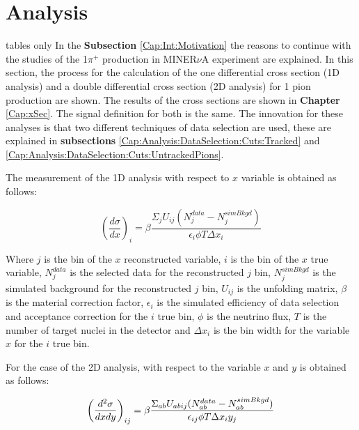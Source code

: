 \chapter{Analysis}
\minitoc
\label{Cap:Analysis}

tables only
\label{Cap:Analysis:Introduction}
In the \textbf{Subsection} \ref{Cap:Int:Motivation} the reasons to continue with the studies of the 1$\pi^+$ production in MINER$\nu$A experiment are explained. In this section, the process for the calculation of the one differential cross section (1D analysis) and a double differential cross section (2D analysis) for 1 pion production are shown. The results of the cross sections are shown in \textbf{Chapter} \ref{Cap:xSec}. The signal definition for both is the same. The innovation for these analyses is that two different techniques of data selection are used, these are explained in \textbf{subsections} \ref{Cap:Analysis:DataSelection:Cuts:Tracked} and \ref{Cap:Analysis:DataSelection:Cuts:UntrackedPions}. 

The measurement of the 1D analysis with respect to $x$ variable is obtained as follows:

\begin{equation}
    \left(\frac{d\sigma}{dx}\right)_i= \beta \frac{\Sigma_{j}U_{ij}(N^{data}_j - N^{simBkgd}_j)}{\epsilon_{i}\phi T\Delta x_i}
    \label{eq:difXSec}
\end{equation}

Where $j$ is the bin of the $x$ reconstructed variable, $i$ is the bin of the $x$ true variable, $N_j^{data}$ is the selected data for the reconstructed $j$ bin, $N_j^{sim Bkgd}$ is the simulated background for the reconstructed $j$ bin, $U_{ij}$ is the unfolding matrix, $\beta$ is the material correction factor, $\epsilon_i$ is the simulated efficiency of data selection and acceptance correction for the $i$ true bin, $\phi$ is the neutrino flux, $T$ is the number of target nuclei in the detector and $\Delta x_i$ is the bin width for the variable $x$ for the $i$ true bin.

For the case of the 2D analysis, with respect to the variable $x$ and $y$ is obtained as follows:

\begin{equation}
    \centering
    \left(\frac{d^2\sigma}{dxdy}\right)_{ij}= \beta \frac{\Sigma_{ab}U_{abij}(N^{data}_{ab} - N^{simBkgd}_{ab})}{\epsilon_{ij}\phi T\Delta x_{i}y_j}
\end{equation}

